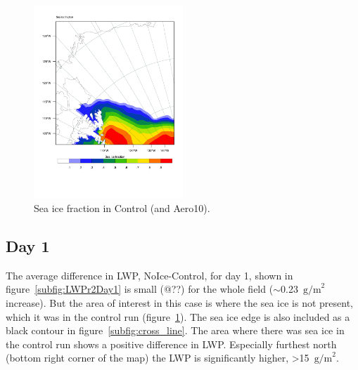 \begin{figure}[hb]
\centering
\includegraphics[width=0.5\textwidth]{results/control/seaiceplot.pdf}
\caption{Sea ice fraction in Control (and Aero10).}
\label{fig:seaice}
\end{figure}

\subsection{Day 1}
\label{sec:noiceDay1}
The average difference in LWP, NoIce-Control, for day 1, shown in figure~\ref{subfig:LWPr2Day1} is small (@??) for the whole field ($\sim$0.23~$\text{g/m}^2$ increase). But the area of interest in this case is where the sea ice is not present, which it was in the control run (figure~\ref{fig:seaice}). The sea ice edge is also included as a black contour in figure~\ref{subfig:cross_line}. The area where there was sea ice in the control run shows a positive difference in LWP. Especially furthest north (bottom right corner of the map) the LWP is significantly higher, >15~$\text{g/m}^2$.

